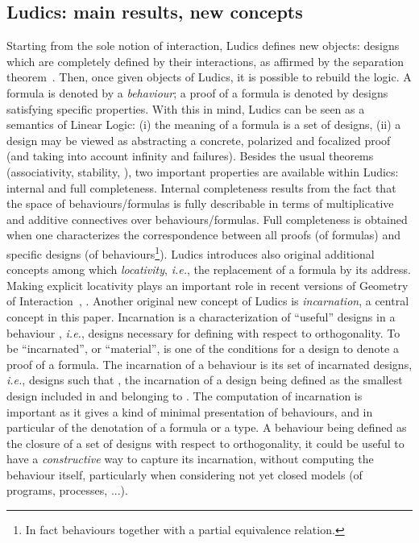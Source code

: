 \documentclass{LMCS}
\def\ie{{\em i.e.}}
\begin{document}
{\subsection{Ludics: main results, new concepts} 

Starting from the sole notion of interaction, Ludics  defines new objects: 
designs which are completely defined by their interactions, as affirmed by the separation theorem~\cite{DBLP:journals/mscs/Girard01}. 
Then, once given objects of Ludics, it is possible to rebuild the logic. A formula is denoted by a {\em behaviour}; a proof of a formula is denoted by designs satisfying specific properties.
With this in mind, Ludics can be seen as a semantics of Linear Logic: (i) the meaning of a formula is a set of designs, (ii) a design may be viewed as abstracting a concrete, polarized and focalized proof (and taking into account infinity and failures). 
Besides the usual theorems (associativity, stability, ), two important properties are available within Ludics: internal and full completeness. Internal completeness results from the fact that the space of behaviours/formulas is fully describable in terms of multiplicative and additive connectives over behaviours/formulas.
Full completeness is obtained when one characterizes the correspondence between all proofs (of formulas) and specific designs (of behaviours\footnote{In fact behaviours together with a partial equivalence relation.}).
Ludics introduces also original additional concepts among which {\em locativity}, \ie, the replacement of a formula by its address. Making explicit locativity  plays an important role in recent versions of Geometry of Interaction~\cite{DBLP:journals/tcs/Girard11}, \cite{DBLP:journals/apal/Seiller12}. Another original new concept of Ludics is {\em incarnation}, a central concept in this paper.
Incarnation is a characterization of ``useful'' designs in a behaviour , \ie, designs necessary for defining  with respect to orthogonality. To be ``incarnated'', or ``material'', is one of the conditions for a design to denote a proof of a formula. The incarnation  of a behaviour  is its set of incarnated designs, \ie, designs  such that , the incarnation  of a design  being defined as the smallest design included in  and belonging to .
The computation of incarnation is important as it gives a kind of minimal presentation of behaviours, and in particular of the denotation of a formula or a type. 
A behaviour being defined as the closure of a set of designs with respect to orthogonality, it could be useful to have a {\em constructive} way to capture its incarnation, without computing the behaviour itself, particularly when considering not yet closed models (of programs, processes, ...). 


}
\end{document}
